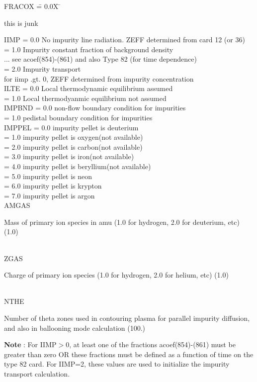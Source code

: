 \begin{tabbing} 
FRACOX \= = 0.0X \= \parbox[t]{\width}{this is junk} \kill 
IIMP \> = 0.0 \> No impurity line radiation.  ZEFF determined from card 12 (or 36) \\ 
     \> = 1.0 \> Impurity constant fraction of background density \\ 
     \>       \> ... see acoef(854)-(861) and also Type 82 (for time dependence) \\
     \> = 2.0 \> Impurity transport \\
     \>       \> for iimp .gt. 0, ZEFF determined from impurity concentration \\
ILTE \> = 0.0 \> Local thermodynamic equilibrium assumed\\ 
     \> = 1.0 \> Local thermodyanmic equilibrium not assumed\\ 
IMPBND \> = 0.0 \> non-flow boundary condition for impurities\\
     \> = 1.0 \> pedistal boundary condition for impurities\\
IMPPEL \> = 0.0 \> impurity pellet is deuterium\\
     \> = 1.0 \> impurity pellet is oxygen(not available)\\
     \> = 2.0 \> impurity pellet is carbon(not available)\\
     \> = 3.0 \> impurity pellet is iron(not available)\\
     \> = 4.0 \> impurity pellet is beryllium(not available)\\
     \> = 5.0 \> impurity pellet is neon\\
     \> = 6.0 \> impurity pellet is krypton\\
     \> = 7.0 \> impurity pellet is argon\\
AMGAS \>  \>  \parbox[t]{\width}{Mass of primary ion species in amu (1.0 for hydrogen, 2.0
for deuterium,
etc) (1.0)}\\ 
ZGAS \> \>  \parbox[t]{\width}{Charge of primary ion species (1.0 for hydrogen, 2.0 for helium,
etc) (1.0)}\\ 
NTHE \> \> \parbox[t]{\width}{Number of theta zones used in contouring plasma for parallel
impurity diffusion, and also in ballooning mode calculation (100.)} 
\end{tabbing} 
{\bf Note} : For IIMP$>$0, at least one of the fractions acoef(854)-(861) must be greater
than
zero OR these fractions must be defined as a function of time on the type 82 card.  
For IIMP=2, these values are used to initialize the impurity transport calculation. 
